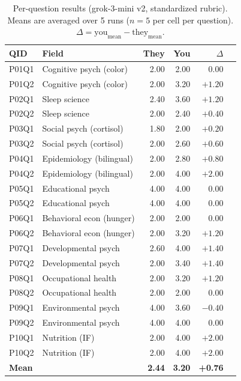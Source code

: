 \documentclass[12pt, letterpaper]{article}
\begin{document}
\begin{table}[h]
\centering
\caption{Per-question results (grok-3-mini v2, standardized rubric). Means are averaged
over 5 runs ($n = 5$ per cell per question). $\Delta = \text{you}_\text{mean}
- \text{they}_\text{mean}$.}
\label{tab:perquestion}
\small
\begin{tabular}{llrrrr}
\toprule
\textbf{QID} & \textbf{Field} & \textbf{They} & \textbf{You} & \textbf{$\Delta$} \\
\midrule
P01Q1 & Cognitive psych (color)   & 2.00 & 2.00 & $0.00$ \\
P01Q2 & Cognitive psych (color)   & 2.00 & 3.20 & $+1.20$ \\
P02Q1 & Sleep science             & 2.40 & 3.60 & $+1.20$ \\
P02Q2 & Sleep science             & 2.00 & 2.40 & $+0.40$ \\
P03Q1 & Social psych (cortisol)   & 1.80 & 2.00 & $+0.20$ \\
P03Q2 & Social psych (cortisol)   & 2.00 & 2.60 & $+0.60$ \\
P04Q1 & Epidemiology (bilingual)  & 2.00 & 2.80 & $+0.80$ \\
P04Q2 & Epidemiology (bilingual)  & 2.00 & 4.00 & $+2.00$ \\
P05Q1 & Educational psych         & 4.00 & 4.00 & $0.00$ \\
P05Q2 & Educational psych         & 4.00 & 4.00 & $0.00$ \\
P06Q1 & Behavioral econ (hunger)  & 2.00 & 2.00 & $0.00$ \\
P06Q2 & Behavioral econ (hunger)  & 2.00 & 3.20 & $+1.20$ \\
P07Q1 & Developmental psych       & 2.60 & 4.00 & $+1.40$ \\
P07Q2 & Developmental psych       & 2.00 & 3.40 & $+1.40$ \\
P08Q1 & Occupational health       & 2.00 & 3.20 & $+1.20$ \\
P08Q2 & Occupational health       & 2.00 & 2.00 & $0.00$ \\
P09Q1 & Environmental psych       & 4.00 & 3.60 & $-0.40$ \\
P09Q2 & Environmental psych       & 4.00 & 4.00 & $0.00$ \\
P10Q1 & Nutrition (IF)            & 2.00 & 4.00 & $+2.00$ \\
P10Q2 & Nutrition (IF)            & 2.00 & 4.00 & $+2.00$ \\
\midrule
\textbf{Mean} & & \textbf{2.44} & \textbf{3.20} & \textbf{+0.76} \\
\bottomrule
\end{tabular}
\end{table}
\end{document}
